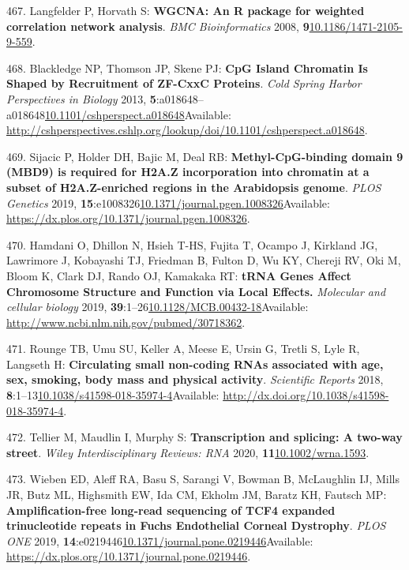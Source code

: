 \documentclass[
]{book}
\begin{document}
\leavevmode\hypertarget{ref-Langfelder2008}{}%
467. Langfelder P, Horvath S: \textbf{WGCNA: An R package for weighted correlation network analysis}. \emph{BMC Bioinformatics} 2008, \textbf{9}\href{https://doi.org/10.1186/1471-2105-9-559}{10.1186/1471-2105-9-559}.

\leavevmode\hypertarget{ref-Blackledge2013}{}%
468. Blackledge NP, Thomson JP, Skene PJ: \textbf{CpG Island Chromatin Is Shaped by Recruitment of ZF-CxxC Proteins}. \emph{Cold Spring Harbor Perspectives in Biology} 2013, \textbf{5}:a018648--a018648\href{https://doi.org/10.1101/cshperspect.a018648}{10.1101/cshperspect.a018648}Available: \url{http://cshperspectives.cshlp.org/lookup/doi/10.1101/cshperspect.a018648}.

\leavevmode\hypertarget{ref-Sijacic2019}{}%
469. Sijacic P, Holder DH, Bajic M, Deal RB: \textbf{Methyl-CpG-binding domain 9 (MBD9) is required for H2A.Z incorporation into chromatin at a subset of H2A.Z-enriched regions in the Arabidopsis genome}. \emph{PLOS Genetics} 2019, \textbf{15}:e1008326\href{https://doi.org/10.1371/journal.pgen.1008326}{10.1371/journal.pgen.1008326}Available: \url{https://dx.plos.org/10.1371/journal.pgen.1008326}.

\leavevmode\hypertarget{ref-Hamdani2019}{}%
470. Hamdani O, Dhillon N, Hsieh T-HS, Fujita T, Ocampo J, Kirkland JG, Lawrimore J, Kobayashi TJ, Friedman B, Fulton D, Wu KY, Chereji RV, Oki M, Bloom K, Clark DJ, Rando OJ, Kamakaka RT: \textbf{tRNA Genes Affect Chromosome Structure and Function via Local Effects.} \emph{Molecular and cellular biology} 2019, \textbf{39}:1--26\href{https://doi.org/10.1128/MCB.00432-18}{10.1128/MCB.00432-18}Available: \url{http://www.ncbi.nlm.nih.gov/pubmed/30718362}.

\leavevmode\hypertarget{ref-Rounge2018}{}%
471. Rounge TB, Umu SU, Keller A, Meese E, Ursin G, Tretli S, Lyle R, Langseth H: \textbf{Circulating small non-coding RNAs associated with age, sex, smoking, body mass and physical activity}. \emph{Scientific Reports} 2018, \textbf{8}:1--13\href{https://doi.org/10.1038/s41598-018-35974-4}{10.1038/s41598-018-35974-4}Available: \url{http://dx.doi.org/10.1038/s41598-018-35974-4}.

\leavevmode\hypertarget{ref-Tellier2020}{}%
472. Tellier M, Maudlin I, Murphy S: \textbf{Transcription and splicing: A two-way street}. \emph{Wiley Interdisciplinary Reviews: RNA} 2020, \textbf{11}\href{https://doi.org/10.1002/wrna.1593}{10.1002/wrna.1593}.

\leavevmode\hypertarget{ref-Wieben2019}{}%
473. Wieben ED, Aleff RA, Basu S, Sarangi V, Bowman B, McLaughlin IJ, Mills JR, Butz ML, Highsmith EW, Ida CM, Ekholm JM, Baratz KH, Fautsch MP: \textbf{Amplification-free long-read sequencing of TCF4 expanded trinucleotide repeats in Fuchs Endothelial Corneal Dystrophy}. \emph{PLOS ONE} 2019, \textbf{14}:e0219446\href{https://doi.org/10.1371/journal.pone.0219446}{10.1371/journal.pone.0219446}Available: \url{https://dx.plos.org/10.1371/journal.pone.0219446}.
\end{document}
